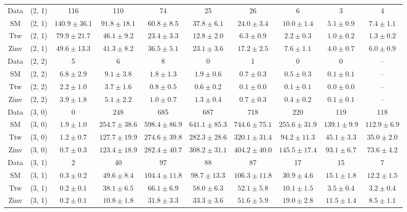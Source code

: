 \begin{table}[h!]
{\begin{tabular}{cccccccccc}
	Data & (2, 1) & 116 & 110 & 74 & 25 & 26 & 6 & 3 & 4 \\[0.5ex] 
	SM & (2, 1) & $140.9\pm 36.1$ & $91.8\pm 18.1$ & $60.8\pm 8.5$ & $37.8\pm 6.1$ & $24.0\pm 3.4$ & $10.0\pm 1.4$ & $5.1\pm 0.9$ & $7.4\pm 1.1$ \\[0.5ex] 
	Ttw & (2, 1) & $79.9\pm 21.7$ & $46.1\pm 9.2$ & $23.4\pm 3.3$ & $12.8\pm 2.0$ & $6.3\pm 0.9$ & $2.2\pm 0.3$ & $1.0\pm 0.2$ & $1.3\pm 0.2$ \\[0.5ex] 
	Zinv & (2, 1) & $49.6\pm 13.3$ & $41.3\pm 8.2$ & $36.5\pm 5.1$ & $23.1\pm 3.6$ & $17.2\pm 2.5$ & $7.6\pm 1.1$ & $4.0\pm 0.7$ & $6.0\pm 0.9$ \\[0.5ex] 
	Data & (2, 2) & 5 & 6 & 8 & 0 & 1 & 0 & 0 & -- \\[0.5ex] 
	SM & (2, 2) & $6.8\pm 2.9$ & $9.1\pm 3.8$ & $1.8\pm 1.3$ & $1.9\pm 0.6$ & $0.7\pm 0.3$ & $0.5\pm 0.3$ & $0.1\pm 0.1$ & -- \\[0.5ex] 
	Ttw & (2, 2) & $2.2\pm 1.0$ & $3.7\pm 1.6$ & $0.8\pm 0.5$ & $0.6\pm 0.2$ & $0.1\pm 0.0$ & $0.1\pm 0.1$ & $0.0\pm 0.0$ & -- \\[0.5ex] 
	Zinv & (2, 2) & $3.9\pm 1.8$ & $5.1\pm 2.2$ & $1.0\pm 0.7$ & $1.3\pm 0.4$ & $0.7\pm 0.3$ & $0.4\pm 0.2$ & $0.1\pm 0.1$ & -- \\[0.5ex] 
	Data & (3, 0) & 0 & 248 & 685 & 687 & 718 & 220 & 119 & 118 \\[0.5ex] 
	SM & (3, 0) & $1.9\pm 1.0$ & $254.7\pm 38.6$ & $598.4\pm 86.9$ & $641.1\pm 85.3$ & $744.6\pm 75.1$ & $255.6\pm 31.9$ & $139.1\pm 9.9$ & $112.9\pm 6.9$ \\[0.5ex] 
	Ttw & (3, 0) & $1.2\pm 0.7$ & $127.7\pm 19.9$ & $274.6\pm 39.8$ & $282.3\pm 28.6$ & $320.1\pm 31.4$ & $94.2\pm 11.3$ & $45.1\pm 3.3$ & $35.0\pm 2.0$ \\[0.5ex] 
	Zinv & (3, 0) & $0.7\pm 0.3$ & $123.4\pm 18.9$ & $282.4\pm 40.7$ & $308.2\pm 31.1$ & $404.2\pm 40.0$ & $145.5\pm 17.4$ & $93.1\pm 6.7$ & $73.6\pm 4.2$ \\[0.5ex] 
	Data & (3, 1) & 2 & 40 & 97 & 88 & 87 & 17 & 15 & 7 \\[0.5ex] 
	SM & (3, 1) & $0.3\pm 0.2$ & $49.6\pm 8.4$ & $104.4\pm 11.8$ & $98.7\pm 13.3$ & $106.3\pm 11.8$ & $30.9\pm 4.6$ & $15.1\pm 1.8$ & $12.2\pm 1.5$ \\[0.5ex] 
	Ttw & (3, 1) & $0.2\pm 0.1$ & $38.1\pm 6.5$ & $66.1\pm 6.9$ & $58.0\pm 6.3$ & $52.1\pm 5.8$ & $10.1\pm 1.5$ & $3.5\pm 0.4$ & $3.2\pm 0.4$ \\[0.5ex] 
	Zinv & (3, 1) & $0.2\pm 0.1$ & $10.8\pm 1.8$ & $31.8\pm 3.3$ & $33.3\pm 3.6$ & $51.6\pm 5.9$ & $19.0\pm 2.8$ & $11.5\pm 1.4$ & $8.5\pm 1.1$ \\[0.5ex] 

\end{tabular}}
\end{table}
